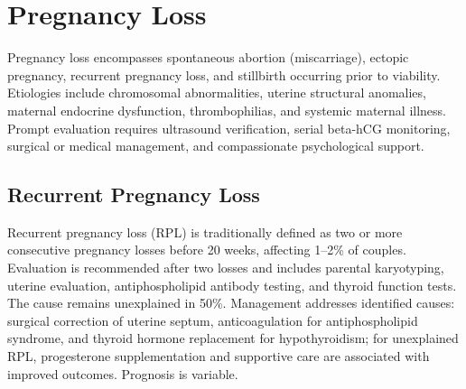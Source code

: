 \section{Pregnancy Loss}




Pregnancy loss encompasses spontaneous abortion (miscarriage), ectopic pregnancy, recurrent pregnancy loss, and stillbirth occurring prior to viability. Etiologies include chromosomal abnormalities, uterine structural anomalies, maternal endocrine dysfunction, thrombophilias, and systemic maternal illness. Prompt evaluation requires ultrasound verification, serial beta-hCG monitoring, surgical or medical management, and compassionate psychological support.





\label{sec:Pregnancy Loss}

\subsection{Recurrent Pregnancy Loss}
\label{sec:Recurrent Pregnancy Loss}
Recurrent pregnancy loss (RPL) is traditionally defined as two or more consecutive pregnancy losses before 20 weeks, affecting 1--2\% of couples. Evaluation is recommended after two losses and includes parental karyotyping, uterine evaluation, antiphospholipid antibody testing, and thyroid function tests. The cause remains unexplained in 50\%. Management addresses identified causes: surgical correction of uterine septum, anticoagulation for antiphospholipid syndrome, and thyroid hormone replacement for hypothyroidism; for unexplained RPL, progesterone supplementation and supportive care are associated with improved outcomes. Prognosis is variable.


